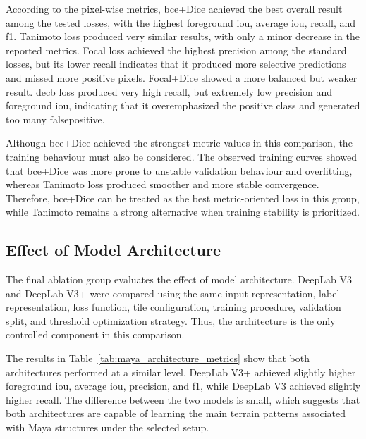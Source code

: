 According to the pixel-wise metrics, \gls{bce}+Dice achieved the best overall result among the tested losses, with the highest foreground \gls{iou}, average \gls{iou}, recall, and \gls{f1}. Tanimoto loss produced very similar results, with only a minor decrease in the reported metrics. Focal loss achieved the highest precision among the standard losses, but its lower recall indicates that it produced more selective predictions and missed more positive pixels. Focal+Dice showed a more balanced but weaker result. \gls{decb} loss produced very high recall, but extremely low precision and foreground \gls{iou}, indicating that it overemphasized the positive class and generated too many \gls{falsepositive}.

Although \gls{bce}+Dice achieved the strongest metric values in this comparison, the training behaviour must also be considered. The observed training curves showed that \gls{bce}+Dice was more prone to unstable validation behaviour and overfitting, whereas Tanimoto loss produced smoother and more stable convergence. Therefore, \gls{bce}+Dice can be treated as the best metric-oriented loss in this group, while Tanimoto remains a strong alternative when training stability is prioritized.

\subsection{Effect of Model Architecture}

The final ablation group evaluates the effect of model architecture. DeepLab V3 and DeepLab V3+ were compared using the same input representation, label representation, loss function, tile configuration, training procedure, validation split, and threshold optimization strategy. Thus, the architecture is the only controlled component in this comparison.

The results in Table~\ref{tab:maya_architecture_metrics} show that both architectures performed at a similar level. DeepLab V3+ achieved slightly higher foreground \gls{iou}, average \gls{iou}, precision, and \gls{f1}, while DeepLab V3 achieved slightly higher recall. The difference between the two models is small, which suggests that both architectures are capable of learning the main terrain patterns associated with Maya structures under the selected setup.

